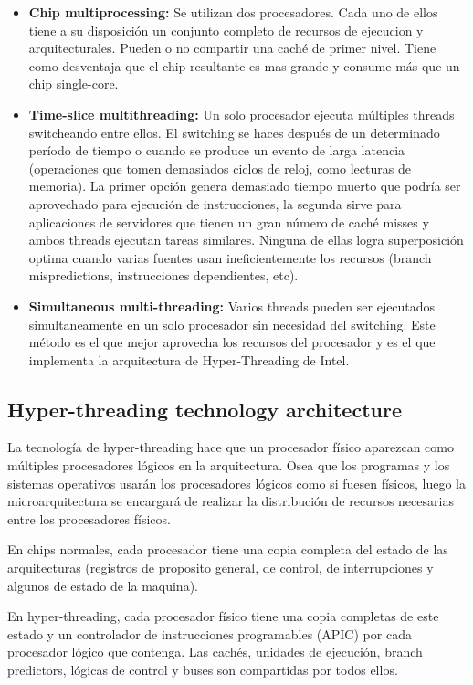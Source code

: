 \begin{itemize}
	\item \textbf{Chip multiprocessing:}
	 Se utilizan dos procesadores. Cada uno de ellos tiene a su disposición un conjunto completo de recursos de ejecucion y arquitecturales. Pueden o no compartir una caché de primer nivel. Tiene como desventaja que el chip resultante es mas grande y consume más que un chip single-core.
	\item\textbf{Time-slice multithreading:} Un solo procesador ejecuta múltiples threads switcheando entre ellos. El switching se haces después de un determinado período de tiempo o cuando se produce un evento de larga latencia (operaciones que tomen demasiados ciclos de reloj, como lecturas de memoria). La primer opción genera demasiado tiempo muerto que podría ser aprovechado para ejecución de instrucciones, la segunda sirve para aplicaciones de servidores que tienen un gran número de caché misses y ambos threads ejecutan tareas similares. Ninguna de ellas logra superposición optima cuando varias fuentes usan ineficientemente los recursos (branch mispredictions, instrucciones dependientes, etc).
	\item \textbf{Simultaneous multi-threading:} Varios threads pueden ser ejecutados simultaneamente en un solo procesador sin necesidad del switching. Este método es el que mejor aprovecha los recursos del procesador y es el que implementa la arquitectura de Hyper-Threading de Intel.
\end{itemize}

\subsection{Hyper-threading technology architecture}

La tecnología de hyper-threading hace que un procesador físico aparezcan como múltiples procesadores lógicos en la arquitectura. Osea que los programas y los sistemas operativos usarán los procesadores lógicos como si fuesen físicos, luego la microarquitectura se encargará de realizar la distribución de recursos necesarias entre los procesadores físicos.

En chips normales, cada procesador tiene una copia completa del estado de las arquitecturas (registros de proposito general, de control, de interrupciones y algunos de estado de la maquina). 

En hyper-threading, cada procesador físico tiene una copia completas de este estado y un controlador de instrucciones programables (APIC) por cada procesador lógico que contenga.  Las cachés, unidades de ejecución, branch predictors, lógicas de control y buses son compartidas por todos ellos.

